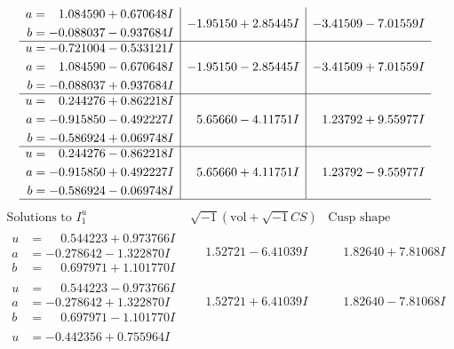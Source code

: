 \documentclass[1p]{elsarticle_modified}
\theoremstyle{definition}
\newcommand{\I}{\sqrt{-1}}
\begin{document}
$$\begin{array}{c|c|c}
\begin{aligned}
a &= \phantom{-}1.084590 + 0.670648 I \\
b &= -0.088037 - 0.937684 I\end{aligned}
 & -1.95150 + 2.85445 I & -3.41509 - 7.01559 I \\ \hline\begin{aligned}
u &= -0.721004 - 0.533121 I \\
a &= \phantom{-}1.084590 - 0.670648 I \\
b &= -0.088037 + 0.937684 I\end{aligned}
 & -1.95150 - 2.85445 I & -3.41509 + 7.01559 I \\ \hline\begin{aligned}
u &= \phantom{-}0.244276 + 0.862218 I \\
a &= -0.915850 - 0.492227 I \\
b &= -0.586924 + 0.069748 I\end{aligned}
 & \phantom{-}5.65660 - 4.11751 I & \phantom{-}1.23792 + 9.55977 I \\ \hline\begin{aligned}
u &= \phantom{-}0.244276 - 0.862218 I \\
a &= -0.915850 + 0.492227 I \\
b &= -0.586924 - 0.069748 I\end{aligned}
 & \phantom{-}5.65660 + 4.11751 I & \phantom{-}1.23792 - 9.55977 I\\
 \hline 
 \end{array}$$\newpage$$\begin{array}{c|c|c}  
\text{Solutions to }I^u_{1}& \I (\text{vol} + \sqrt{-1}CS) & \text{Cusp shape}\\
 \hline 
\begin{aligned}
u &= \phantom{-}0.544223 + 0.973766 I \\
a &= -0.278642 - 1.322870 I \\
b &= \phantom{-}0.697971 + 1.101770 I\end{aligned}
 & \phantom{-}1.52721 - 6.41039 I & \phantom{-}1.82640 + 7.81068 I \\ \hline\begin{aligned}
u &= \phantom{-}0.544223 - 0.973766 I \\
a &= -0.278642 + 1.322870 I \\
b &= \phantom{-}0.697971 - 1.101770 I\end{aligned}
 & \phantom{-}1.52721 + 6.41039 I & \phantom{-}1.82640 - 7.81068 I \\ \hline\begin{aligned}
u &= -0.442356 + 0.755964 I \\

\end{aligned}
\end{array}$$
\end{document}

